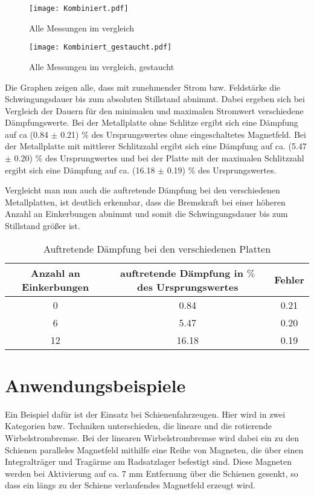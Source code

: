 \begin{figure}
  \centering
  \texttt{[image: Kombiniert.pdf]}
  \caption{Alle Messungen im vergleich}
  \label{fig:Kombiniert}
\end{figure}

\begin{figure}
  \centering
  \texttt{[image: Kombiniert\_gestaucht.pdf]}
  \caption{Alle Messungen im vergleich, gestaucht}
  \label{fig:Kombiniert}
\end{figure}

Die Graphen zeigen alle, dass mit zunehmender Strom bzw. Feldstärke die Schwingungsdauer
bis zum absoluten Stillstand abnimmt. Dabei ergeben sich bei Vergleich der Dauern
für den minimalen und maximalen Stromwert verschiedene Dämpfungswerte.
Bei der Metallplatte ohne Schlitze ergibt sich eine Dämpfung auf ca (0.84 $\pm$ 0.21)
$\%$ des Ursprungswertes ohne eingeschaltetes Magnetfeld.
Bei der Metallplatte mit mittlerer Schlitzzahl ergibt sich eine Dämpfung auf
ca. (5.47 $\pm$ 0.20) $\%$ des Ursprungwertes und bei der Platte mit der maximalen
Schlitzzahl ergibt sich eine Dämpfung auf ca. (16.18 $\pm$ 0.19) $\%$ des
Ursprungswertes.

Vergleicht man nun auch die auftretende Dämpfung bei den verschiedenen
Metallplatten, ist deutlich erkennbar, dass die Bremskraft bei einer höheren
Anzahl an Einkerbungen abnimmt und somit die Schwingungsdauer bis zum Stillstand
größer ist.

\begin{table}
  \caption{Auftretende Dämpfung bei den verschiedenen Platten}
  \label{tab:Daempfungen}
   \begin{tabular}{c c c}
      \toprule
      Anzahl an Einkerbungen & auftretende Dämpfung in $\%$ des Ursprungswertes & Fehler \\
      \midrule
      0 & 0.84 & 0.21 \\
      6 & 5.47 & 0.20 \\
      12 & 16.18 & 0.19 \\
      \bottomrule
    \end{tabular}
\end{table}

\section{Anwendungsbeispiele}

Ein Beispiel dafür ist der Einsatz bei Schienenfahrzeugen. Hier wird in zwei
Kategorien bzw. Techniken unterschieden, die lineare und die rotierende Wirbelstrombremse.
Bei der linearen Wirbelstrombremse wird dabei ein zu den Schienen paralleles
Magnetfeld mithilfe eine Reihe von Magneten, die über einen Integralträger und
Tragärme am Radsatzlager befestigt sind. Diese Magneten werden bei Aktivierung
auf ca. 7 mm Entfernung über die Schienen gesenkt, so dass ein längs zu der Schiene
verlaufendes Magnetfeld erzeugt wird.

